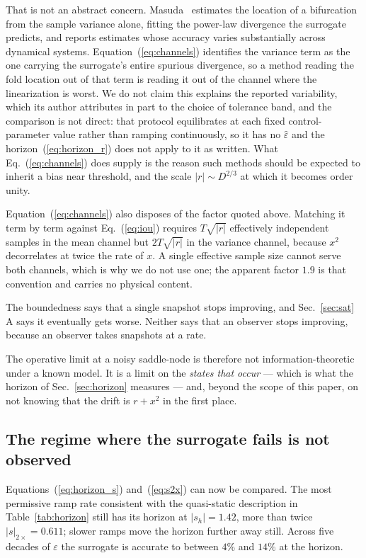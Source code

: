 \documentclass[%
 twocolumn,
 superscriptaddress,
 amsmath,amssymb,
 aps,
 pre,
 floatfix,
]{revtex4-2}
\newcommand{\Sig}{\hat\varepsilon}
\begin{document}
That is not an abstract concern.  Masuda~\cite{Masuda2026} estimates the location of a bifurcation from the sample variance alone, fitting the power-law divergence the surrogate predicts, and reports estimates whose accuracy varies substantially across dynamical systems.  Equation~(\ref{eq:channels}) identifies the variance term as the one carrying the surrogate's entire spurious divergence, so a method reading the fold location out of that term is reading it out of the channel where the linearization is worst.  We do not claim this explains the reported variability, which its author attributes in part to the choice of tolerance band, and the comparison is not direct: that protocol equilibrates at each fixed control-parameter value rather than ramping continuously, so it has no $\Sig$ and the horizon~(\ref{eq:horizon_r}) does not apply to it as written.  What Eq.~(\ref{eq:channels}) does supply is the reason such methods should be expected to inherit a bias near threshold, and the scale $|r|\sim D^{2/3}$ at which it becomes order unity.

Equation~(\ref{eq:channels}) also disposes of the factor quoted above.  Matching it term by term against Eq.~(\ref{eq:iou}) requires $T\sqrt{|r|}$ effectively independent samples in the mean channel but $2T\sqrt{|r|}$ in the variance channel, because $x^2$ decorrelates at twice the rate of $x$.  A single effective sample size cannot serve both channels, which is why we do not use one; the apparent factor $1.9$ is that convention and carries no physical content.

The boundedness says that a single snapshot stops improving, and Sec.~\ref{sec:sat}\,A says it eventually gets worse.  Neither says that an observer stops improving, because an observer takes snapshots at a rate.

The operative limit at a noisy saddle-node is therefore not information-theoretic under a known model.  It is a limit on the \emph{states that occur} --- which is what the horizon of Sec.~\ref{sec:horizon} measures --- and, beyond the scope of this paper, on not knowing that the drift is $r+x^2$ in the first place.

\subsection{The regime where the surrogate fails is not observed}

Equations~(\ref{eq:horizon_s}) and~(\ref{eq:s2x}) can now be compared.  The most permissive ramp rate consistent with the quasi-static description in Table~\ref{tab:horizon} still has its horizon at $|s_h|=1.42$, more than twice $|s|_{2\times}=0.611$; slower ramps move the horizon further away still.  Across five decades of $\varepsilon$ the surrogate is accurate to between $4\%$ and $14\%$ at the horizon.
\end{document}
